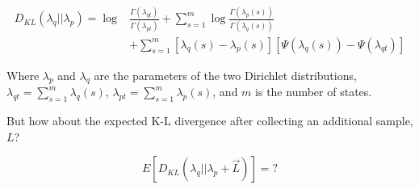 \documentclass[twocolumn,floatfix,nofootinbib,aps]{revtex4-1}
\begin{document}
\begin{align*}
D_{KL}(\lambda_q || \lambda_p) = \log& \frac{\Gamma(\lambda_{qt})}{\Gamma(\lambda_{pt})} + \sum_{s=1}^m \log \frac{\Gamma(\lambda_p(s))}{\Gamma(\lambda_q(s))} \\
&+ \sum_{s=1}^m \left[\lambda_q(s) -\lambda_p(s)\right]\left[\Psi(\lambda_q(s)) - \Psi(\lambda_{qt})\right]
\end{align*}

Where $\lambda_p$ and $\lambda_q$ are the parameters of the two Dirichlet distributions, $\lambda_{qt} = \sum_{s=1}^{m}\lambda_q(s)$, $\lambda_{pt} = \sum_{s=1}^{m}\lambda_p(s)$, and $m$ is the number of states.

But how about the expected K-L divergence after collecting an additional sample, $L$?

$$
E[D_{KL}(\lambda_q || \lambda_p + \vec{L})] = ?
$$
\end{document}
